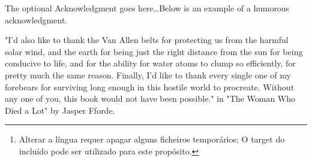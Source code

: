 

\frontmatter %

%

\pagestyle{plain} %
\setcounter{secnumdepth}{3}


\maketitlepage



\begin{abstract}


Trabalhos escritos em língua Inglesa devem incluir um resumo alargado com cerca de 1000 palavras, ou duas páginas.

Se o trabalho estiver escrito em Português, este resumo deveria ser em língua Inglesa, com cerca de 200 palavras, ou uma página.

Para alterar a língua basta ir às configurações do documento no ficheiro  e alterar para a língua desejada ('english' ou 'portuguese')\footnote{Alterar a língua requer apagar alguns ficheiros temporários; O target  do  incluído pode ser utilizado para este propósito.}. Isto fará com que os cabeçalhos incluídos no template sejam traduzidos para a respetiva língua.

\end{abstract}


\begin{acknowledgements}

The optional Acknowledgment goes here\ldots Below is an example of a humorous acknowledgment.

"I'd also like to thank the Van Allen belts for protecting us from the harmful solar wind, and the earth for being just the right distance from the sun for being conducive to life, and for the ability for water atoms to clump so efficiently, for pretty much the same reason. Finally, I'd like to thank every single one of my forebears for surviving long enough in this hostile world to procreate. Without any one of you, this book would not have been possible." in "The Woman Who Died a Lot" by Jasper Fforde.

\end{acknowledgements}

